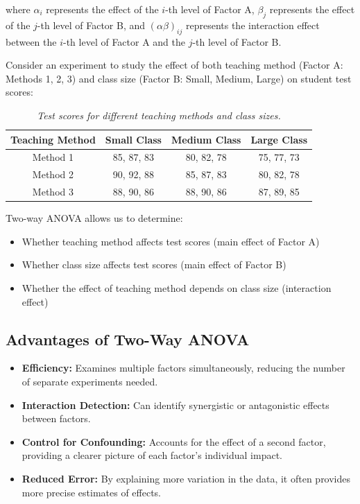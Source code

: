\documentclass[twoside]{book}
\begin{document}
where $\alpha_i$ represents the effect of the $i$-th level of Factor A, $\beta_j$ represents the effect of the $j$-th level of Factor B, and $(\alpha\beta)_{ij}$ represents the interaction effect between the $i$-th level of Factor A and the $j$-th level of Factor B.

\vspace{0.5em}
\noindent
Consider an experiment to study the effect of both teaching method (Factor A: Methods 1, 2, 3) and class size (Factor B: Small, Medium, Large) on student test scores:

\begin{table}[H]
\centering
\begin{tabular}{c|c|c|c}
\toprule
\textbf{Teaching Method} & \textbf{Small Class} & \textbf{Medium Class} & \textbf{Large Class} \\
\midrule
Method 1 & 85, 87, 83 & 80, 82, 78 & 75, 77, 73 \\
Method 2 & 90, 92, 88 & 85, 87, 83 & 80, 82, 78 \\
Method 3 & 88, 90, 86 & 88, 90, 86 & 87, 89, 85 \\
\bottomrule
\end{tabular}
\caption{\textit{Test scores for different teaching methods and class sizes.}}
\end{table}

Two-way ANOVA allows us to determine:
\begin{itemize}
\item Whether teaching method affects test scores (main effect of Factor A)
\item Whether class size affects test scores (main effect of Factor B)
\item Whether the effect of teaching method depends on class size (interaction effect)
\end{itemize}

\subsection{Advantages of Two-Way ANOVA}

\begin{itemize}
\item \textbf{Efficiency:} Examines multiple factors simultaneously, reducing the number of separate experiments needed.
\item \textbf{Interaction Detection:} Can identify synergistic or antagonistic effects between factors.
\item \textbf{Control for Confounding:} Accounts for the effect of a second factor, providing a clearer picture of each factor's individual impact.
\item \textbf{Reduced Error:} By explaining more variation in the data, it often provides more precise estimates of effects.
\end{itemize}
\end{document}
